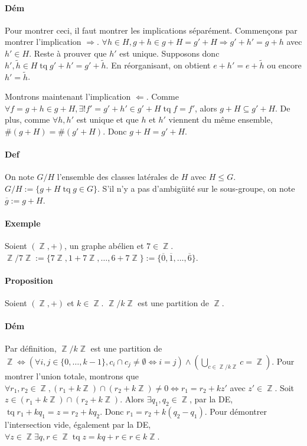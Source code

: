 \documentclass{article}
\DeclareMathOperator{\tq}{\text{ tq }}
\DeclareMathOperator{\Z}{\mathbb Z}
\begin{document}
			\paragraph{Dém} Pour montrer ceci, il faut montrer les implications séparément. Commençons par montrer l'implication $\Rightarrow$.
			$\forall h \in H, g + h \in g + H = g' + H \Rightarrow g' + h' = g + h$ avec $h' \in H$. Reste à prouver que $h'$ est unique.
			Supposons donc $h', \widetilde{h} \in H \tq g' + h' = g' + \widetilde{h}$. En réorganisant, on obtient $e+h' = e+\widetilde{h}$ ou encore
			$h' = \widetilde{h}$.

			Montrons maintenant l'implication $\Leftarrow$. Comme $\forall f = g + h \in g + H, \exists! f' = g' + h' \in g' + H \tq f = f'$, alors
			$g + H \subseteq g' + H$. De plus, comme $\forall h, h'$ est unique et que $h$ et $h'$ viennent du même ensemble, $\#(g + H) = \#(g' + H)$.
			Donc $g + H = g' + H$.

			\paragraph{Def} On note $G/H$ l'ensemble des classes latérales de $H$ avec $H \leq G$. $G/H := \{g + H \tq g \in G\}$. S'il n'y a pas
			d'ambigüité sur le sous-groupe, on note $\overline{g} := g + H$.

			\paragraph{Exemple} Soient $(\Z, +)$, un graphe abélien et $7 \in \Z$. $\Z/7\Z := \{7\Z, 1 + 7\Z, \ldots, 6 + 7\Z\} :=
			\{\overline 0, \overline 1, \ldots, \overline 6\}$.

			\paragraph{Proposition} Soient $(\Z, +)$ et $k \in \Z$. $\Z/k\Z$ est une partition de $\Z$.

			\paragraph{Dém} Par définition, $\Z/k\Z$ est une partition de $\Z \iff (\forall i, j \in \{0, \ldots, k-1\}, c_i \cap c_j \neq \emptyset \iff i = j)
			\land (\bigcup_{c \in \Z/k\Z} c = \Z)$. Pour montrer l'union totale, montrons que $\forall r_1, r_2 \in \Z, (r_1 + k\Z) \cap (r_2 + k\Z) \neq 0
			\iff r_1 = r_2 + kz'$ avec $z' \in \Z$. Soit $z \in (r_1 + k\Z) \cap (r_2 + k\Z)$. Alors $\exists q_1, q_2 \in \Z$, par la DE, $\tq
			r_1 + kq_1 = z = r_2 + kq_2$. Donc $r_1 = r_2 + k(q_2 - q_1)$. Pour démontrer l'intersection vide, également par la DE, $\forall z \in \Z
			\exists q, r \in \Z \tq z = kq + r \in r \in k\Z$.
\end{document}
